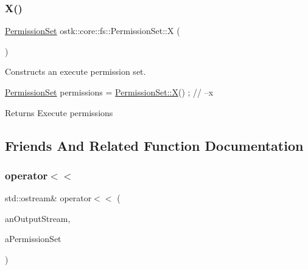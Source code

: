 \subsubsection{\texorpdfstring{X()}{X()}}
{\footnotesize\ttfamily \hyperlink{classostk_1_1core_1_1fs_1_1_permission_set}{Permission\+Set} ostk\+::core\+::fs\+::\+Permission\+Set\+::X (\begin{DoxyParamCaption}{ }\end{DoxyParamCaption})\hspace{0.3cm}{\ttfamily [static]}}



Constructs an execute permission set. 


\begin{DoxyCode}
\hyperlink{classostk_1_1core_1_1fs_1_1_permission_set_a31c918014e874ceac487e92d0d3ac5a2}{PermissionSet} permissions = \hyperlink{classostk_1_1core_1_1fs_1_1_permission_set_ac84670d9520228b38bb8555b7f1e399f}{PermissionSet::X}() ; \textcolor{comment}{// --x}
\end{DoxyCode}


\begin{DoxyReturn}{Returns}
Execute permissions 
\end{DoxyReturn}


\subsection{Friends And Related Function Documentation}
\mbox{\label{classostk_1_1core_1_1fs_1_1_permission_set_a8f2d68bb94d86dea76869abe148ea9f3}} 
\subsubsection{\texorpdfstring{operator$<$$<$}{operator<<}}
{\footnotesize\ttfamily std\+::ostream\& operator$<$$<$ (\begin{DoxyParamCaption}\item[{std\+::ostream \&}]{an\+Output\+Stream,  }\item[{const \hyperlink{classostk_1_1core_1_1fs_1_1_permission_set}{Permission\+Set} \&}]{a\+Permission\+Set }\end{DoxyParamCaption})\hspace{0.3cm}{\ttfamily [friend]}}



